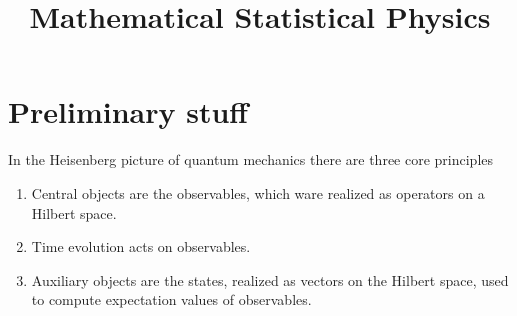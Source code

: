\documentclass[
a4paper, %
11pt, %
onecolumn, %
openany, %
]{memoir}
\author{}
\title{Mathematical Statistical Physics}
\theoremstyle{definition}
\theoremstyle{remark}
\theoremstyle{plain}
\begin{document}
\setlength{\parindent}{0pt}
\maketitle
\tableofcontents

\newpage\chapter{Preliminary stuff}
In the Heisenberg picture of quantum mechanics there are three core principles \begin{enumerate}
	\item Central objects are the observables, which ware realized as operators on a Hilbert space.
	\item Time evolution acts on observables.
	\item Auxiliary objects are the states, realized as vectors on the Hilbert space, used to compute expectation values of observables.
\end{enumerate}
\end{document}
